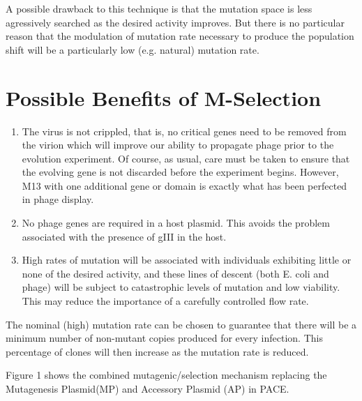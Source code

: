 \documentclass[10pt,letterpaper]{article}
\begin{document}
A possible drawback to this technique is that the mutation space is less agressively searched as the desired activity improves.  But there is no particular reason that the modulation of mutation rate necessary to produce the population shift will be a particularly low (e.g. natural) mutation rate.

\section{Possible Benefits of M-Selection}
\begin{enumerate}
\item{The virus is not crippled, that is, no critical genes need to be removed from the virion which will improve our ability to propagate phage prior to the evolution experiment.  Of course, as usual, care must be taken to ensure that the evolving gene is not discarded before the experiment begins.  However, M13 with one additional gene or domain is exactly what has been perfected in phage display.}
\item{No phage genes are required in a host plasmid.  This avoids the problem associated with the presence of gIII in the host.}
\item{High rates of mutation will be associated with individuals exhibiting little or none of the desired activity, and these lines of descent (both E. coli and phage) will be subject to catastrophic levels of mutation and low viability. This may reduce the importance of a carefully controlled flow rate.}
\end{enumerate}

The nominal (high) mutation rate can be chosen to guarantee that there will be a minimum number of non-mutant copies produced for every infection.  This percentage of clones will then increase as the mutation rate is reduced.

Figure 1 shows the combined mutagenic/selection mechanism replacing the Mutagenesis Plasmid(MP) and Accessory Plasmid (AP) in PACE.

\def\boxone#1{
  \put(19,30){\line(1,0){67}}     %
  \put(19,0){\line(1,0){67}}      %
  \put(20,0){\line(0,1){30}}      %
  \put(85,0){\line(0,1){30}}      %
  \put(25,15){#1}
}
\def\boxtwo#1#2{
  \put(19,30){\line(1,0){80}}     %
  \put(19,0){\line(1,0){80}}      %
  \put(20,0){\line(0,1){30}}      %
  \put(98,0){\line(0,1){30}}      %
  \put(25,17){#1}
  \put(25,7){#2}
}
\def\circleone#1#2{\circle{#1}\put(-17,-4){#2}}
\def\circletwo#1#2#3{\circle{#1}\put(-17,0){#2}\put(-15,20){#3}}
\end{document}
